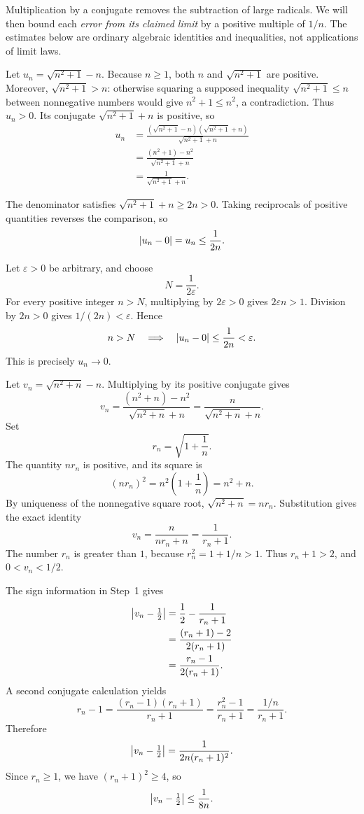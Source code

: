 \idea Multiplication by a conjugate removes the subtraction of large
radicals. We will then bound each \emph{error from its claimed limit}
by a positive multiple of $1/n$. The estimates below are ordinary
algebraic identities and inequalities, not applications of limit laws.

Let $u_n=\sqrt{n^2+1}-n$.
Because $n\ge1$, both $n$ and $\sqrt{n^2+1}$ are positive.
Moreover, $\sqrt{n^2+1}>n$: otherwise squaring a supposed inequality
$\sqrt{n^2+1}\le n$ between nonnegative numbers would give
$n^2+1\le n^2$, a contradiction. Thus $u_n>0$.
Its conjugate $\sqrt{n^2+1}+n$ is positive, so
\begin{align*}
 u_n
  &=\frac{(\sqrt{n^2+1}-n)(\sqrt{n^2+1}+n)}
          {\sqrt{n^2+1}+n}\\
  &=\frac{(n^2+1)-n^2}{\sqrt{n^2+1}+n}\\
  &=\frac1{\sqrt{n^2+1}+n}.
\end{align*}

The denominator satisfies $\sqrt{n^2+1}+n\ge2n>0$.
Taking reciprocals of positive quantities reverses the comparison, so
\[
 \left|u_n-0\right|=u_n\le\frac1{2n}.
\]

Let $\varepsilon>0$ be arbitrary, and choose
\[
 N=\frac1{2\varepsilon}.
\]
For every positive integer $n>N$, multiplying by $2\varepsilon>0$
gives $2\varepsilon n>1$. Division by $2n>0$ gives
$1/(2n)<\varepsilon$. Hence
\[
 n>N\quad\Longrightarrow\quad
 \left|u_n-0\right|\le\frac1{2n}<\varepsilon.
\]
This is precisely $u_n\to0$.


Let $v_n=\sqrt{n^2+n}-n$. Multiplying by its positive conjugate gives
\[
 v_n=\frac{(n^2+n)-n^2}{\sqrt{n^2+n}+n}
     =\frac{n}{\sqrt{n^2+n}+n}.
\]
Set
\[
 r_n=\sqrt{1+\frac1n}.
\]
The quantity $nr_n$ is positive, and its square is
\[
 (nr_n)^2=n^2\left(1+\frac1n\right)=n^2+n.
\]
By uniqueness of the nonnegative square root,
$\sqrt{n^2+n}=nr_n$. Substitution gives the exact identity
\[
 v_n=\frac{n}{nr_n+n}
     =\frac1{r_n+1}.
\]
The number $r_n$ is greater than $1$, because $r_n^2=1+1/n>1$.
Thus $r_n+1>2$, and $0<v_n<1/2$.

The sign information in Step~1 gives
\begin{align*}
 \left|v_n-\tfrac12\right|
  &=\frac12-\frac1{r_n+1}\\
  &=\frac{(r_n+1)-2}{2(r_n+1)}\\
  &=\frac{r_n-1}{2(r_n+1)}.
\end{align*}
A second conjugate calculation yields
\[
 r_n-1
   =\frac{(r_n-1)(r_n+1)}{r_n+1}
   =\frac{r_n^2-1}{r_n+1}
   =\frac{1/n}{r_n+1}.
\]
Therefore
\[
 \left|v_n-\tfrac12\right|
   =\frac1{2n(r_n+1)^2}.
\]
Since $r_n\ge1$, we have $(r_n+1)^2\ge4$, so
\[
 \left|v_n-\tfrac12\right|\le\frac1{8n}.
\]

